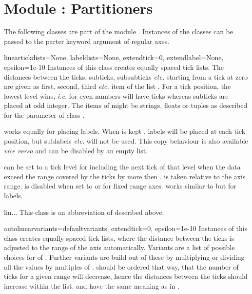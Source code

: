 \section{Module : Partitioners} %


The following classes are part of the module .
Instances of the classes can be passed to the parter keyword argument
of regular axes.

\begin{classdesc}{linear}{tickdists=None, labeldists=None,
                          extendtick=0, extendlabel=None,
                          epsilon=1e-10}
  Instances of this class creates equally spaced tick lists. The
  distances between the ticks, subticks, subsubticks \emph{etc.}
  starting from a tick at zero are given as first, second, third
  \emph{etc.} item of the list . For a tick position,
  the lowest level wins, \emph{i.e.} for \code{[2, 1]} even numbers
  will have ticks whereas subticks are placed at odd integer. The
  items of  might be strings, floats or tuples as
  described for the  parameter of class .

   works equally for placing labels. When
   is kept , labels will be placed at each
  tick position, but sublabels \emph{etc.} will not be used. This copy
  behaviour is also available \emph{vice versa} and can be disabled by
  an empty list.

   can be set to a tick level for including the next
  tick of that level when the data exceed the range covered by the
  ticks by more then .  is taken relative
  to the axis range.  is disabled when set to
   or for fixed range axes.  works similar
  to  but for labels.
\end{classdesc}

\begin{classdesc}{lin}{...}
This class is an abbreviation of  described above.
\end{classdesc}

\begin{classdesc}{autolinear}{variants=defaultvariants,
                              extendtick=0,
                              epsilon=1e-10}
  Instances of this class creates equally spaced tick lists, where the
  distance between the ticks is adjusted to the range of the axis
  automatically. Variants are a list of possible choices for
   of . Further variants are build out of
  these by multiplying or dividing all the values by multiples of
  .  should be ordered that way, that the
  number of ticks for a given range will decrease, hence the distances
  between the ticks should increase within the  list.
   and  have the same meaning as in
  .
\end{classdesc}

